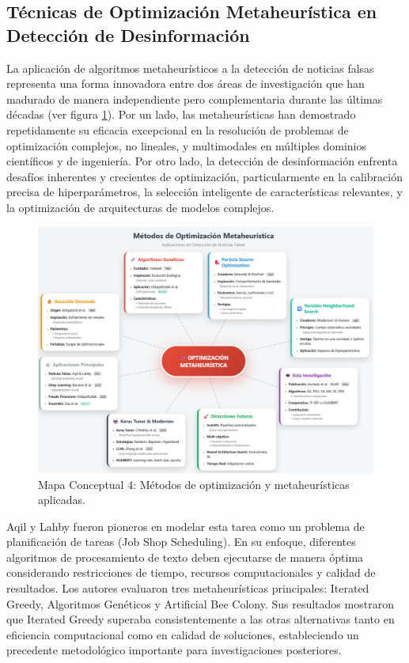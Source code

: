 \subsection{Técnicas de Optimización Metaheurística en Detección de Desinformación}

La aplicación de algoritmos metaheurísticos a la detección de noticias falsas representa una forma innovadora entre dos áreas de investigación que han madurado de manera independiente pero complementaria durante las últimas décadas (ver figura \ref{fig:mapa_conceptual_4}). Por un lado, las metaheurísticas han demostrado repetidamente su eficacia excepcional en la resolución de problemas de optimización complejos, no lineales, y multimodales en múltiples dominios científicos y de ingeniería. Por otro lado, la detección de desinformación enfrenta desafíos inherentes y crecientes de optimización, particularmente en la calibración precisa de hiperparámetros, la selección inteligente de características relevantes, y la optimización de arquitecturas de modelos complejos.

\begin{figure}[h!]
    \centering
    \includegraphics[width=\textwidth]{Imagenes/mapaConceptual4.png}
    \caption{Mapa Conceptual 4: Métodos de optimización y metaheurísticas aplicadas.}
    \label{fig:mapa_conceptual_4}
\end{figure}

Aqil y Lahby \cite{aqil2021modeling} fueron pioneros en modelar esta tarea como un problema de planificación de tareas (Job Shop Scheduling). En su enfoque, diferentes algoritmos de procesamiento de texto deben ejecutarse de manera óptima considerando restricciones de tiempo, recursos computacionales y calidad de resultados. Los autores evaluaron tres metaheurísticas principales: Iterated Greedy, Algoritmos Genéticos y Artificial Bee Colony. Sus resultados mostraron que Iterated Greedy superaba consistentemente a las otras alternativas tanto en eficiencia computacional como en calidad de soluciones, estableciendo un precedente metodológico importante para investigaciones posteriores.

